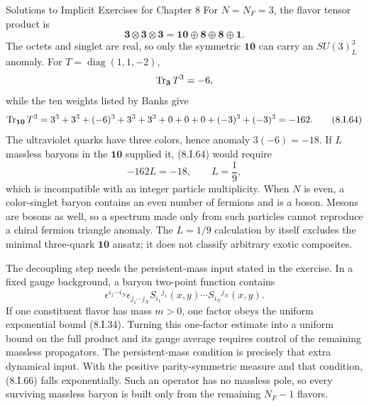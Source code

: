 \begin{bankssolutions}{Solutions to Implicit Exercises for Chapter 8}
For $N=N_F=3$, the flavor tensor product is
\[
 \mathbf3\otimes\mathbf3\otimes\mathbf3
 =\mathbf{10}\oplus\mathbf8\oplus\mathbf8\oplus\mathbf1.
\]
The octets and singlet are real, so only the symmetric $\mathbf{10}$ can
carry an $SU(3)_L^3$ anomaly.  For
$T=\operatorname{diag}(1,1,-2)$,
\[
 \operatorname{Tr}_{\mathbf3}T^3=-6,
\]
while the ten weights listed by Banks give
\[
 \operatorname{Tr}_{\mathbf{10}}T^3
 =3^3+3^3+(-6)^3+3^3+3^3+0+0+0+(-3)^3+(-3)^3
 =-162. \tag{8.I.64}
\]
The ultraviolet quarks have three colors, hence anomaly $3(-6)=-18$.
If $L$ massless baryons in the $\mathbf{10}$ supplied it, (8.I.64) would
require
\[
 -162L=-18,
 \qquad L=\frac19, \tag{8.I.65}
\]
which is incompatible with an integer particle multiplicity.  When $N$ is
even, a color-singlet baryon contains an even number of fermions and is a
boson.  Mesons are bosons as well, so a spectrum made only from such particles
cannot reproduce a chiral fermion triangle anomaly.
The $L=1/9$ calculation by itself excludes the minimal three-quark
$\mathbf{10}$ ansatz; it does not classify arbitrary exotic composites.

The decoupling step needs the persistent-mass input stated in the exercise.
In a fixed gauge background, a baryon two-point function contains
\[
 \epsilon^{i_1\cdots i_N}\epsilon_{j_1\cdots j_N}
 S_{i_1}{}^{j_1}(x,y)\cdots S_{i_N}{}^{j_N}(x,y). \tag{8.I.66}
\]
If one constituent flavor has mass $m>0$, one factor obeys the uniform
exponential bound (8.I.34).  Turning this one-factor estimate into a uniform
bound on the full product and its gauge average requires control of the
remaining massless propagators.  The persistent-mass condition is precisely
that extra dynamical input.  With the positive parity-symmetric measure and
that condition, (8.I.66) falls exponentially.  Such an operator has no
massless pole, so every surviving massless baryon is built only from the
remaining $N_F-1$ flavors.


\end{bankssolutions}
